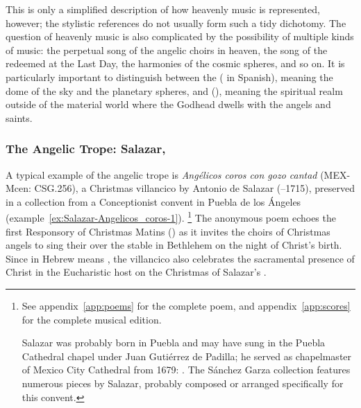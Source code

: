 This is only a simplified description of how heavenly music is represented, however; the stylistic references do not usually form such a tidy dichotomy.
The question of heavenly music is also complicated by the possibility of multiple kinds of  music: the perpetual song of the angelic choirs in heaven, the song of the redeemed at the Last Day, the harmonies of the cosmic spheres, and so on.
It is particularly important to distinguish between the  ( in Spanish), meaning the dome of the sky and the planetary spheres, and  (), meaning the spiritual realm outside of the material world where the Godhead dwells with the angels and saints.

\subsubsection{The Angelic Trope: Salazar, }

A typical example of the angelic trope is \emph{Angélicos coros con gozo cantad} (MEX-Mcen: CSG.256), a Christmas villancico by Antonio de Salazar (--1715), preserved in a collection from a Conceptionist convent in Puebla de los Ángeles (example~\ref{ex:Salazar-Angelicos_coros-1}).%
	\footnote{%
	See appendix~\ref{app:poems} for the complete poem, and appendix~\ref{app:scores} for the complete musical edition.
	
Salazar was probably born in Puebla and may have sung in the Puebla Cathedral chapel under Juan Gutiérrez de Padilla; he served as chapelmaster of Mexico City Cathedral from 1679: \autocite{Koegel:Salazar}. 
The Sánchez Garza collection features numerous pieces by Salazar, probably composed or arranged specifically for this convent.
	}
The anonymous poem echoes the first Responsory of Christmas Matins () as it invites the choirs of Christmas angels to sing their  over the stable in Bethlehem on the night of Christ's birth.
Since  in Hebrew means , the villancico also celebrates the sacramental presence of Christ in the Eucharistic host on the Christmas of Salazar's .

